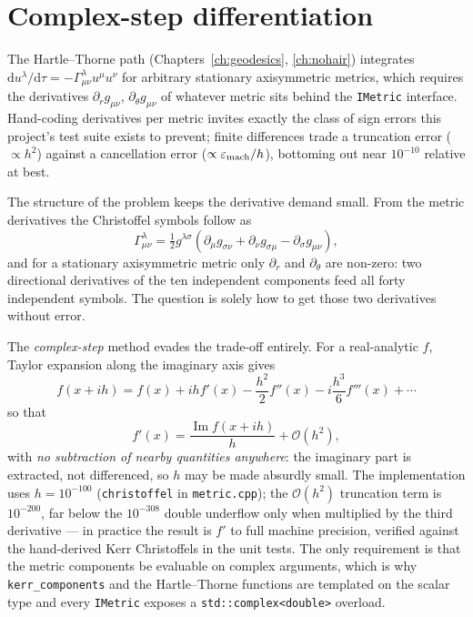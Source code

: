 \section{Complex-step differentiation}
\label{sec:complexstep}

The Hartle--Thorne path (Chapters~\ref{ch:geodesics}, \ref{ch:nohair})
integrates $\mathrm{d}u^\lambda/\mathrm{d}\tau =
-\Gamma^\lambda_{\mu\nu}u^\mu u^\nu$ for arbitrary stationary
axisymmetric metrics, which requires the derivatives
$\partial_r g_{\mu\nu}$, $\partial_\theta g_{\mu\nu}$ of whatever metric
sits behind the \texttt{IMetric} interface. Hand-coding derivatives per
metric invites exactly the class of sign errors this project's test
suite exists to prevent; finite differences trade a truncation error
($\propto h^2$) against a cancellation error ($\propto
\varepsilon_{\rm mach}/h$), bottoming out near $10^{-10}$ relative at
best.

The structure of the problem keeps the derivative demand small. From
the metric derivatives the Christoffel symbols follow as
\begin{equation}
\Gamma^\lambda_{\mu\nu} = \tfrac12 g^{\lambda\sigma}
\left(\partial_\mu g_{\sigma\nu} + \partial_\nu g_{\sigma\mu}
- \partial_\sigma g_{\mu\nu}\right),
\label{eq:christoffel}
\end{equation}
and for a stationary axisymmetric metric only $\partial_r$ and
$\partial_\theta$ are non-zero: two directional derivatives of the ten
independent components feed all forty independent symbols. The question
is solely how to get those two derivatives without error.

The \emph{complex-step} method \citep{SquireTrapp1998} evades the
trade-off entirely. For a real-analytic $f$, Taylor expansion along the
imaginary axis gives
\begin{equation}
f(x + ih) = f(x) + ih f'(x) - \frac{h^2}{2}f''(x)
- i\frac{h^3}{6}f'''(x) + \cdots
\end{equation}
so that
\begin{equation}
f'(x) = \frac{\operatorname{Im} f(x + ih)}{h} + \mathcal{O}(h^2),
\label{eq:cstep}
\end{equation}
with \emph{no subtraction of nearby quantities anywhere}: the imaginary
part is extracted, not differenced, so $h$ may be made absurdly small.
The implementation uses $h = 10^{-100}$
(\texttt{christoffel} in \texttt{metric.cpp}); the $\mathcal{O}(h^2)$
truncation term is $10^{-200}$, far below the $10^{-308}$ double
underflow only when multiplied by the third derivative — in practice the
result is $f'$ to full machine precision, verified against the
hand-derived Kerr Christoffels in the unit tests. The only requirement
is that the metric components be evaluable on complex arguments, which
is why \texttt{kerr\_components} and the Hartle--Thorne functions are
templated on the scalar type and every \texttt{IMetric} exposes a
\texttt{std::complex<double>} overload.

